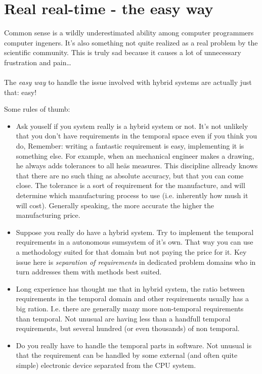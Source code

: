 \chapter{Real real-time - the easy way}
Common sense is a wildly underestimated ability among computer programmers computer ingeners. It's also something not quite realized as a real problem by the scientific community. This is truly sad because it causes a lot of unnecessary frustration and pain\ldots
\\\\
The \textit{easy way} to handle the issue involved with hybrid systems are actually just that: easy! 

Some rules of thumb:
\begin{itemize}
\item Ask youself if you system really is a hybrid system or not. It's not unlikely that you don't have requirements in the temporal space even if you think you do, Remember: writing a fantastic requirement is easy, implementing it is something else. For example, when an mechanical engineer makes a drawing, he always adds tolerances to all heäs measures. This discipline allready knows that there are no such thing as absolute accuracy, but that you can come close. The tolerance is a sort of requirement for the manufacture, and will determine which manufacturing process to use (i.e. inherently how mush it will cost). Generally speaking, the more accurate the higher the manufacturing price.
\item Suppose you really do have a hybrid system. Try to implement the temporal requirements in a autonomous sumsystem of it's own. That way you can use a methodology suited for that domain but not paying the price for it. Key issue here is \textit{separation of requirements} in dedicated problem domains who in turn addresses them with methods best suited.
\item Long experience has thought me that in hybrid system, the ratio between requirements in the temporal domain and other requirements usually has a big ration. I.e. there are generally many more non-temporal requirements than temporal. Not unusual are having less than a handfull temporal requirements, but several hundred (or even thousands) of non temporal.
\item Do you really have to handle the temporal parts in software. Not unusual is that the requirement can be handled by some external (and often quite simple) electronic device separated from the CPU system.
\end{itemize}



